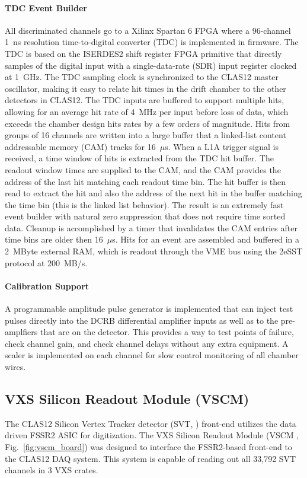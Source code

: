 \paragraph{TDC Event Builder}
All discriminated channels go to a Xilinx Spartan 6 FPGA where a 96-channel 1~ns resolution time-to-digital converter (TDC) is implemented in firmware. The TDC is based on the ISERDES2 shift register FPGA primitive that directly samples of the digital input with a single-data-rate (SDR) input register clocked at 1~GHz. The TDC sampling clock is synchronized to the CLAS12 master oscillator, making it easy to relate hit times in the drift chamber to the other detectors in CLAS12. The TDC inputs are buffered to support multiple hits, allowing for an average hit rate of 4~MHz per input before loss of data, which exceeds the chamber design hits rates by a few orders of magnitude. Hits from groups of 16 channels are written into a large buffer that a linked-list content addressable memory (CAM) tracks for 16~$\mu$s. When a L1A trigger signal is received, a time window of hits is extracted from the TDC hit buffer. The readout window times are supplied to the CAM, and the CAM provides the address of the last hit matching each readout time bin. The hit buffer is then read to extract the hit and also the address of the next hit in the buffer matching the time bin (this is the linked list behavior). The result is an extremely fast event builder with natural zero suppression that does not require time sorted data. Cleanup is accomplished by a timer that invalidates the CAM entries after time bins are older then 16~$\mu$s. Hits for an event are assembled and buffered in a 2~MByte external RAM, which is readout through the VME bus using the 2eSST protocol at 200~MB/s.

\paragraph{Calibration Support}
A programmable amplitude pulse generator is implemented that can inject test pulses directly into the DCRB differential amplifier inputs as well as to the pre-amplfiers that are on the detector. This provides a way to test points of failure, check channel gain, and check channel delays without any extra equipment. A scaler is implemented on each channel for slow control monitoring of all chamber wires.

\subsection{VXS Silicon Readout Module (VSCM)}
The CLAS12 Silicon Vertex Tracker detector (SVT, \cite{svt-ref}) front-end utilizes the data driven FSSR2 ASIC for digitization. The VXS Silicon Readout Module (VSCM \cite{vscm-ref}, Fig.~\ref{fig:vscm_board}) was designed to interface the FSSR2-based front-end to the CLAS12 DAQ system. This system is capable of reading out all 33,792 SVT channels in 3 VXS crates.

